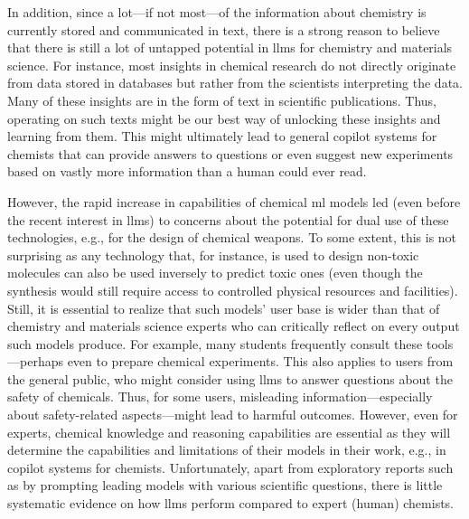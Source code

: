 \documentclass[11pt, oneside]{article}
\begin{document}
\begin{refsection}
In addition, since a lot---if not most---of the information about chemistry is currently stored and communicated in text, there is a strong reason to believe that there is still a lot of untapped potential in \glspl{llm} for chemistry and materials science.\autocite{miret2024llms}
For instance, most insights in chemical research do not directly originate from data stored in databases but rather from the scientists interpreting the data.
Many of these insights are in the form of text in scientific publications.
Thus, operating on such texts might be our best way of unlocking these insights and learning from them.
This might ultimately lead to general copilot systems for chemists that can provide answers to questions or even suggest new experiments based on vastly more information than a human could ever read.

However, the rapid increase in capabilities of chemical \gls{ml} models led (even before the recent interest in \glspl{llm}) to concerns about the potential for dual use of these technologies, e.g., for the design of chemical weapons.\autocite{gopal2023releasing, ganguli2022red, Urbina_2022, campbell2023censoring, moulange2023towards, urbina2022teachable}
To some extent, this is not surprising as any technology that, for instance, is used to design non-toxic molecules can also be used inversely to predict toxic ones (even though the synthesis would still require access to controlled physical resources and facilities).
Still, it is essential to realize that such models' user base is wider than that of chemistry and materials science experts who can critically reflect on every output such models produce.
For example, many students frequently consult these tools---perhaps even to prepare chemical experiments.\autocite{Intelligent.com_2023}
This also applies to users from the general public, who might consider using \glspl{llm} to answer questions about the safety of chemicals.
Thus, for some users, misleading information---especially about safety-related aspects---might lead to harmful outcomes.
However, even for experts, chemical knowledge and reasoning capabilities are essential as they will determine the capabilities and limitations of their models in their work, e.g., in copilot systems for chemists.
Unfortunately, apart from exploratory reports such as by prompting leading models with various scientific questions,\autocite{ai4science2023impact} there is little systematic evidence on how \glspl{llm} perform compared to expert (human) chemists.


\end{refsection}
\end{document}
